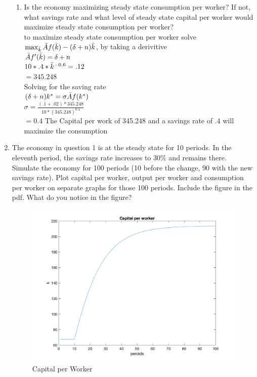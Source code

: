 \documentclass[12pt,oneside,reqno]{amsart}
\begin{document}
\begin{enumerate}
\begin{enumerate}
        \item Is the economy maximizing steady state consumption per worker? If not, what savings rate and what level of steady state capital per worker would maximize steady state consumption per worker?\\
        to maximize steady state consumption per worker solve\\ $\max_{\Bar{k}} \Bar{A}f(\Bar{k})-(\delta+n)\Bar{k}$, by taking a derivitive\\
        $\Bar{A}f'(\Bar{k})=\delta+n$\\
        $10*.4*\Bar{k}^{-0.6}=.12$\\
        $=345.248$\\
        Solving for the saving rate\\
        $(\delta+n)k^*=\sigma\Bar{A}f(k^*)$\\
        $\sigma = \frac{(.1+.02)*345.248}{10*(345.248)^{0.4}}$\\
        $=0.4$ 
        The Capital per work of 345.248 and a savings rate of .4 will maximize the consumption
    \end{enumerate}
    \item The economy in question 1 is at the steady state for 10 periods. In the eleventh period, the savings rate increases to 30\% and remains there. Simulate the economy for 100 periods (10 before the change, 90 with the new savings rate). Plot capital per worker, output per worker and consumption per worker on separate graphs for those 100 periods. Include the figure in the pdf. What do you notice in the figure?
    \begin{figure}[h]
        \centering
        \includegraphics[width =.5\linewidth]{HW1/HW1_Q2_a.png}
        \caption{Capital per Worker}
    \end{figure}
    \vspace{-.5cm}

\end{enumerate}
\end{document}
